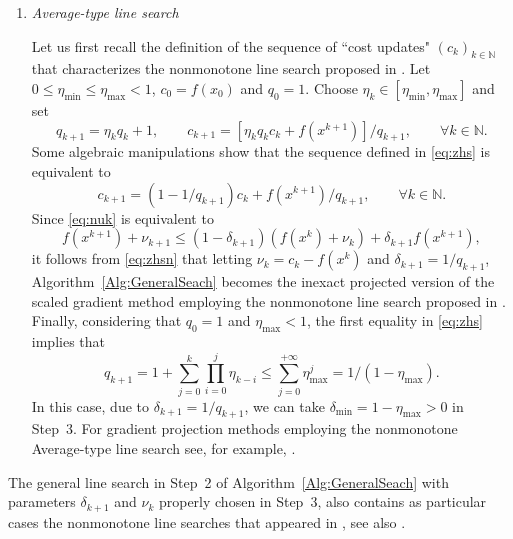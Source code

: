 \begin{enumerate}
	\item {\it Average-type line search}

	      Let us first recall the definition of the sequence of ``cost updates" $(c_k)_{k\in\mathbb{N}}$  that  characterizes the nonmonotone line search proposed in  \cite{ZhangHager2004}. Let   $0\leq \eta_{\min}\leq \eta_{\max}<1$,   $c_0 = f(x_0)$ and  $q_0 = 1$. Choose $\eta_k\in [\eta_{\min},  \eta_{\max}]$ and set
	      \begin{equation} \label{eq:zhs}
		      q_{k+1}=\eta_kq_{k}+1, \qquad c_{k+1} = [\eta_kq_kc_k + f(x^{k+1})]/q_{k+1}, \qquad \forall k \in \mathbb{N}.
	      \end{equation}
	      Some algebraic manipulations show that the sequence defined in   \eqref{eq:zhs} is equivalent to
	      \begin{equation} \label{eq:zhsn}
		      c_{k+1} = (1-1/q_{k+1})c_{k}+f(x^{k+1})/q_{k+1}, \qquad \forall k \in \mathbb{N}.
	      \end{equation}
	      Since \eqref{eq:nuk} is equivalent  to
	      $$
		      f(x^{k+1})+ \nu_{k+1}\leq (1-\delta_{k+1})(f(x^{k})+\nu_{k})+\delta_{k+1}f(x^{k+1}),
	      $$
	      it follows from \eqref{eq:zhsn} that  letting  $\nu_{k}=c_k-f(x^k)$ and $\delta_{k+1}=1/q_{k+1}$, Algorithm~\ref{Alg:GeneralSeach} becomes the  inexact   projected  version of the scaled gradient method employing   the nonmonotone line search proposed in   \cite{ZhangHager2004}.  Finally,  considering that $q_0 = 1$ and  $\eta_{\max}<1$, the  first equality in   \eqref{eq:zhs} implies  that
	      $$
		      q_{k+1}=1+\sum_{j=0}^{k}\prod_{i=0}^{j}\eta_{k-i}\leq \sum_{j=0}^{+\infty} \eta_{\max}^{j}=1/(1-\eta_{\max}).
	      $$
	      In this case, due to $\delta_{k+1}=1/q_{k+1}$, we can take   $\delta_{\min}=1-\eta_{\max}>0$ in  Step~3.  For gradient projection methods employing   the nonmonotone Average-type line search see, for example, \cite{Paulo2007,Schuverdt2019,  Xihong2018}.
\end{enumerate}
\begin{remark}\normalfont \label{rem:outras}
	The general line search in Step~2 of Algorithm~\ref{Alg:GeneralSeach} with  parameters  $\delta_{k+1}$  and  $\nu_{k}$ properly chosen in Step~3, also contains as particular cases the nonmonotone line searches  that appeared in  \cite{Ahookhosh2012,MoLiuYan2007}, see also \cite{GrapigliaSachs2017}.
\end{remark}\normalfont
